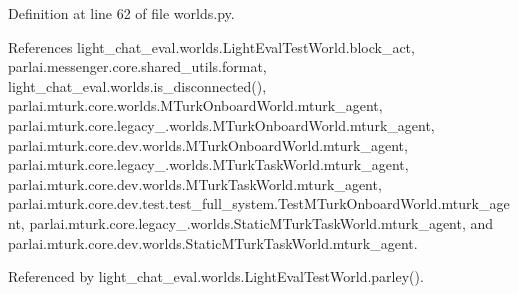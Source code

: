 Definition at line 62 of file worlds.\+py.



References light\+\_\+chat\+\_\+eval.\+worlds.\+Light\+Eval\+Test\+World.\+block\+\_\+act, parlai.\+messenger.\+core.\+shared\+\_\+utils.\+format, light\+\_\+chat\+\_\+eval.\+worlds.\+is\+\_\+disconnected(), parlai.\+mturk.\+core.\+worlds.\+M\+Turk\+Onboard\+World.\+mturk\+\_\+agent, parlai.\+mturk.\+core.\+legacy\+\_.\+worlds.\+M\+Turk\+Onboard\+World.\+mturk\+\_\+agent, parlai.\+mturk.\+core.\+dev.\+worlds.\+M\+Turk\+Onboard\+World.\+mturk\+\_\+agent, parlai.\+mturk.\+core.\+legacy\+\_.\+worlds.\+M\+Turk\+Task\+World.\+mturk\+\_\+agent, parlai.\+mturk.\+core.\+dev.\+worlds.\+M\+Turk\+Task\+World.\+mturk\+\_\+agent, parlai.\+mturk.\+core.\+dev.\+test.\+test\+\_\+full\+\_\+system.\+Test\+M\+Turk\+Onboard\+World.\+mturk\+\_\+agent, parlai.\+mturk.\+core.\+legacy\+\_.\+worlds.\+Static\+M\+Turk\+Task\+World.\+mturk\+\_\+agent, and parlai.\+mturk.\+core.\+dev.\+worlds.\+Static\+M\+Turk\+Task\+World.\+mturk\+\_\+agent.



Referenced by light\+\_\+chat\+\_\+eval.\+worlds.\+Light\+Eval\+Test\+World.\+parley().

